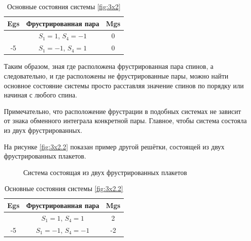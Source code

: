 \documentclass[utf8, babel, sor, jor, amsmath, amssymb, reprint]{elsarticle} %
\begin{document}
\begin{table}[H]
	\centering
	\begin{tabular}{|c|c|c|}
		\hline
		 Egs   &   Фрустрированная пара & Mgs\\
		 \hline
		  &  $S_1=1$, $S_4=-1$ & 0 \\
		  \cline{2-3}
		  	-5	\multirow{3}{*}{}
		   &   $S_1=-1$, $S_4=1$ & 0 \\
		\hline
	\end{tabular}
	\caption{Основные состояния системы \eqref{fig:3x2} }
	\label{tab:gs}
\end{table}

Таким образом, зная где расположена фрустрированная пара спинов, а следовательно, и где расположены не фрустрированные пары, можно найти основное состояние системы просто расставляя значение спинов по порядку или начиная с любого спина. 

Примечательно, что расположение фрустрации в подобных системах не зависит от знака обменного интеграла конкретной пары. Главное, чтобы система состояла из двух фрустрированных.


На рисунке \eqref{fig:3x2.2} показан пример другой решётки, состоящей из двух фрустрированных плакетов.

\begin{figure}[H]
	\centering
	\begin{minipage}{0.3\textwidth}
		\centering
		\caption{Система состоящая из двух фрустрированных плакетов}
		\label{fig:3x2.2}
	\end{minipage}
\end{figure}


\begin{table}[H]
	\centering
	\begin{tabular}{|c|c|c|}
		\hline
		Egs   &   Фрустрированная пара & Mgs \\
		\hline
		   &  $S_1=1$, $S_4=1$ & 2 \\
		\cline{2-3}
		-5	\multirow{3}{*}{}
		 &   $S_1=-1$, $S_4=-1$ & -2 \\
		\hline
	\end{tabular}
	\caption{Основные состояния системы \eqref{fig:3x2.2}}
	\label{tab:gs2}
\end{table}
\end{document}
